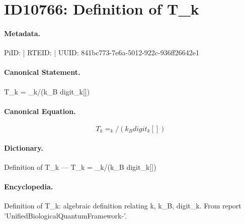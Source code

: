 \section*{ID10766: Definition of T\_k}
\paragraph{Metadata.}
PiID:  | RTEID:  | UUID: 841bc773-7e6a-5012-922c-936ff26642e1

\paragraph{Canonical Statement.}
T\_k = \_k/(k\_B digit\_k[])

\paragraph{Canonical Equation.}
\[
T_k = _k/(k_B  digit_k[])
\]

\paragraph{Dictionary.}
Definition of T\_k — T\_k = \_k/(k\_B  digit\_k[])

\paragraph{Encyclopedia.}
Definition of T\_k: algebraic definition relating k, k\_B, digit\_k. From report 'UnifiedBiologicalQuantumFramework-'.
